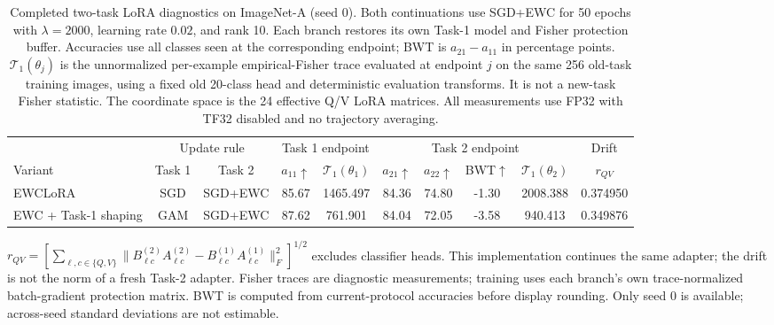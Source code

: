 \begin{table}[t]
\centering
\captionsetup{font=footnotesize,labelfont=bf}
\caption{Completed two-task LoRA diagnostics on ImageNet-A (seed 0).
Both continuations use SGD+EWC for 50 epochs with $\lambda=2000$,
learning rate $0.02$, and rank 10. Each branch restores its own Task-1
model and Fisher protection buffer. Accuracies use all classes seen
at the corresponding endpoint; BWT is $a_{21}-a_{11}$ in percentage points.
$\mathcal T_1(\theta_j)$ is the unnormalized per-example empirical-Fisher
trace evaluated at endpoint $j$ on the same 256 old-task training images,
using a fixed old 20-class head and deterministic evaluation transforms.
It is not a new-task Fisher statistic.
The coordinate space is the 24 effective Q/V LoRA matrices.
All measurements use FP32 with TF32 disabled and no trajectory averaging.}
\label{tab:two_task_imageneta_fixed_future_complete}
\scriptsize
\setlength{\tabcolsep}{2.5pt}
\renewcommand{\arraystretch}{1.08}
\begin{tabular*}{\textwidth}{@{\extracolsep{\fill}}lccccccccc@{}}
\toprule
& \multicolumn{2}{c}{Update rule}
& \multicolumn{2}{c}{Task 1 endpoint}
& \multicolumn{4}{c}{Task 2 endpoint} & Drift \\
\cmidrule(lr){2-3}\cmidrule(lr){4-5}\cmidrule(lr){6-9}
Variant & Task 1 & Task 2 & $a_{11}\uparrow$ & $\mathcal T_1(\theta_1)$
& $a_{21}\uparrow$ & $a_{22}\uparrow$ & BWT$\uparrow$
& $\mathcal T_1(\theta_2)$ & $r_{QV}$ \\
\midrule
EWCLoRA & SGD & SGD+EWC & 85.67 & 1465.497 & 84.36 & 74.80 & -1.30 & 2008.388 & 0.374950 \\
EWC + Task-1 shaping & GAM & SGD+EWC & 87.62 & 761.901 & 84.04 & 72.05 & -3.58 & 940.413 & 0.349876 \\
\bottomrule
\end{tabular*}
\par\smallskip
\begin{minipage}{\textwidth}\scriptsize
$r_{QV}=[\sum_{\ell,c\in\{Q,V\}}
\|B^{(2)}_{\ell c}A^{(2)}_{\ell c}-B^{(1)}_{\ell c}A^{(1)}_{\ell c}\|_F^2]^{1/2}$
excludes classifier heads. This implementation continues the same adapter;
the drift is not the norm of a fresh Task-2 adapter.
Fisher traces are diagnostic measurements; training uses each branch's
own trace-normalized batch-gradient protection matrix.
BWT is computed from current-protocol accuracies before display rounding.
Only seed 0 is available; across-seed standard deviations are not estimable.
\end{minipage}
\end{table}
